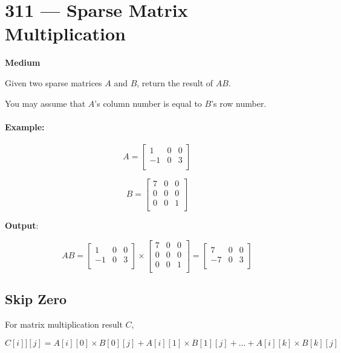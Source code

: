 \section{311 --- Sparse Matrix Multiplication}

\textbf{Medium}

Given two sparse matrices $A$ and $B$, return the result of $AB$.

You may assume that $A$'s column number is equal to $B$'s row number.

\paragraph{Example:}

\begin{flushleft}
\[
A = \begin{bmatrix}
1 & 0 & 0 \\
-1 & 0 & 3 \\
\end{bmatrix}
\]

\[
B = \begin{bmatrix}
7 & 0 & 0 \\
0 & 0 & 0 \\
0 & 0 & 1 \\
\end{bmatrix}
\]

\textbf{Output}:

\[
AB = \begin{bmatrix}
1 & 0 & 0 \\
-1 & 0 & 3 \\
\end{bmatrix} \times \begin{bmatrix}
7 & 0 & 0 \\
0 & 0 & 0 \\
0 & 0 & 1 \\
\end{bmatrix}
=\begin{bmatrix}
7 & 0 & 0 \\
-7 & 0 & 3 \\
\end{bmatrix}
\]


\end{flushleft}

\subsection{Skip Zero}
For matrix multiplication result $C$, 

\[
C[i]][j] = A[i][0]\times B[0][j] + A[i][1]\times B[1][j] + \ldots + A[i][k]\times B[k][j]
\]

